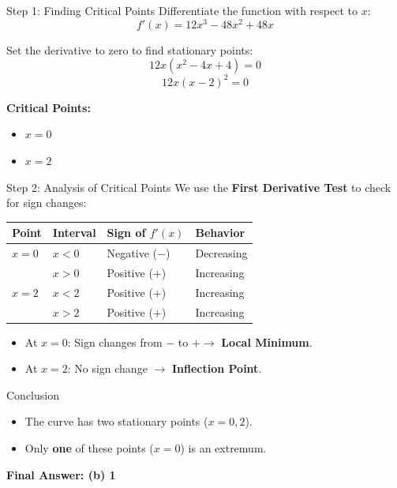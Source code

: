 \documentclass{beamer}
\begin{document}
\begin{frame}{Step 1: Finding Critical Points}
    Differentiate the function with respect to $x$:
    \[ f'(x) = 12x^3 - 48x^2 + 48x \]
    
    Set the derivative to zero to find stationary points:
    \[ 12x(x^2 - 4x + 4) = 0 \]
    \[ 12x(x - 2)^2 = 0 \]
    
    \textbf{Critical Points:}
    \begin{itemize}
        \item $x = 0$
        \item $x = 2$
    \end{itemize}
\end{frame}

\begin{frame}{Step 2: Analysis of Critical Points}
    We use the \textbf{First Derivative Test} to check for sign changes:
    
    \begin{table}[]
        \centering
        \begin{tabular}{@{}l l l l@{}}
        \toprule
        \textbf{Point} & \textbf{Interval} & \textbf{Sign of $f'(x)$} & \textbf{Behavior} \\ \midrule
        $x = 0$        & $x < 0$           & Negative ($-$)           & Decreasing        \\
                       & $x > 0$           & Positive ($+$)           & Increasing        \\ \midrule
        $x = 2$        & $x < 2$           & Positive ($+$)           & Increasing        \\
                       & $x > 2$           & Positive ($+$)           & Increasing        \\ \bottomrule
        \end{tabular}
    \end{table}

    \begin{itemize}
        \item At \textbf{$x = 0$}: Sign changes from $-$ to $+ \rightarrow$ \textbf{Local Minimum}.
        \item At \textbf{$x = 2$}: No sign change $\rightarrow$ \textbf{Inflection Point}.
    \end{itemize}
\end{frame}

\begin{frame}{Conclusion}
    \begin{itemize}
        \item The curve has two stationary points ($x=0, 2$).
        \item Only \textbf{one} of these points ($x=0$) is an extremum.
    \end{itemize}
    
    \vspace{1cm}
    \begin{center}
        \textbf{Final Answer: (b) 1}
    \end{center}
\end{frame}
\end{document}
